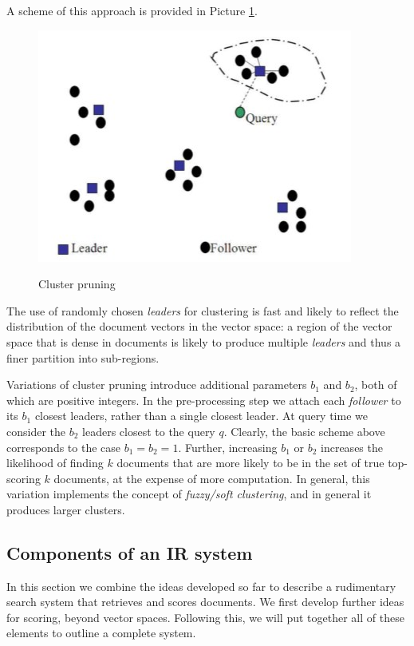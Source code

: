 A scheme of this approach is provided in Picture \ref{cluster pruning}.

\begin{figure}[h!]
		\centering
		\includegraphics[scale = 1.5]{img/cluster pruning.jpg}
		\label{cluster pruning}
        \caption{Cluster pruning}
\end{figure}

The use of randomly chosen \textit{leaders} for clustering is fast and likely to reflect the distribution of the document vectors in the vector space: a region of the vector space that is dense in documents is likely to produce multiple \textit{leaders} and thus a finer partition into sub-regions. 

Variations of cluster pruning introduce additional parameters $b_1$ and $b_2$, both of which are positive integers. In the pre-processing step we attach each \textit{follower} to its $b_1$ closest leaders, rather than a single closest leader. At query time we consider the $b_2$ leaders closest to the query $q$. Clearly, the basic scheme above corresponds to the case $b_1 = b_2 = 1$. Further, increasing $b_1$ or $b_2$ increases the likelihood of finding $k$ documents that are more likely to be in the set of true top-scoring $k$ documents, at the expense of more computation. In general, this variation implements the concept of \textit{fuzzy/soft clustering}, and in general it produces larger clusters.


\subsection{Components of an IR system}\label{8.2}
In this section we combine the ideas developed so far to describe a rudimentary search system that retrieves and scores documents. We first develop further ideas for scoring, beyond vector spaces. Following this, we will put together all of these elements to outline a complete system.

